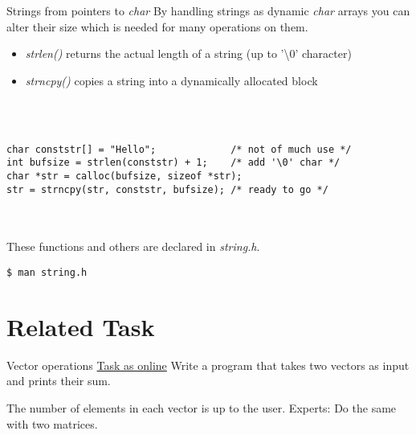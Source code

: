 
\begin{frame}[fragile]{Strings from pointers to \textit{char}}
	By handling strings as dynamic \textit{char} arrays you can alter their size which is needed for many operations on them.
	\begin{itemize}
		\item \textit{strlen()} returns the actual length of a string (up to '\textbackslash 0' character)
		\item \textit{strncpy()} copies a string into a dynamically allocated block
	\end{itemize}\ \\
	\ \\
	\begin{lstlisting}[numbers=none]
char conststr[] = "Hello";			   /* not of much use */
int bufsize = strlen(conststr) + 1;	   /* add '\0' char */
char *str = calloc(bufsize, sizeof *str);
str = strncpy(str, conststr, bufsize); /* ready to go */
\end{lstlisting}\ \\
	\ \\
	These functions and others are declared in \textit{string.h}.
	\begin{lstlisting}[numbers=none]
$ man string.h
\end{lstlisting}
\end{frame}

\section{Related Task}

\begin{frame}{Vector operations}
    \href{http://fsr.github.io/c-lessons/exercises/27_vector_operations.html}{Task as online}
    \newline
    Write a program that takes two vectors as input and prints their sum.
    
    The number of elements in each vector is up to the user.
    \newline 
    \newline
    Experts: Do the same with two matrices.
\end{frame}



